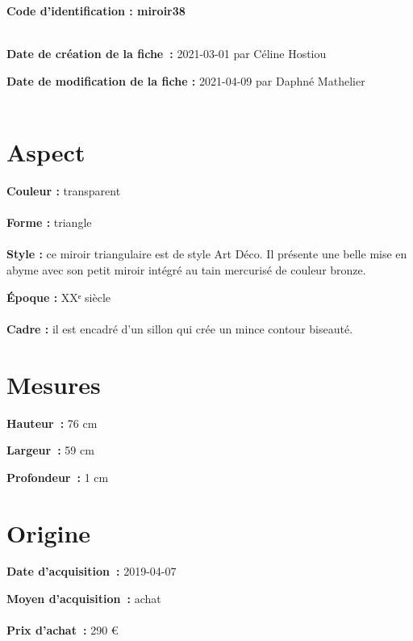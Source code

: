  
    
    
    {\bf \huge Code d’identification : miroir38}
    \\ \\ \hr
    \begin{center}
    \end{center}
    
    {\bf \large Date de création de la fiche :} 2021-03-01
    {par Céline Hostiou}
  
    {\bf \large Date de modification de la fiche :} 2021-04-09 
    {par Daphné Mathelier}
   \\ \\ \hr
    \section* {Aspect}
   {\bf \large Couleur :} transparent
    \\ \\ {\bf \large Forme :}  triangle
    \\ \\ {\bf \large Style :} 
            ce miroir triangulaire est de style Art Déco. Il présente une
            belle mise en abyme avec son petit miroir intégré au tain mercurisé de couleur
            bronze.
        
        {\bf \large Époque :} XXᵉ siècle
    \\ \\ {\bf \large Cadre :} il est encadré d’un sillon qui crée un mince contour biseauté.
        
    \section* {Mesures}
      
  {\bf \large Hauteur :} 76 cm
   
   {\bf \large Largeur :} 59 cm
    
   {\bf \large Profondeur :} 1 cm
     
    \section* {Origine}
    {\bf \large Date d’acquisition :} 2019-04-07

    {\bf \large Moyen d’acquisition :} achat
          \\ \\{\bf \large Prix d’achat :} 290 €
        
